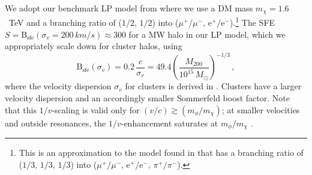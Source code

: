 \documentclass[10pt,aps,pra,reprint,amsmath,amsfonts,amssymb,showpacs,nofootinbib,floatfix]{revtex4-1}
\def\del#1{{}}
\newcommand{\rmn}{\mathrm}
\newcommand{\sfe}{\rmn{sfe}}
\newcommand{\msun}{M_\odot}
\newcommand{\B}{\rmn{B}}
\newcommand{\sigv}{\ensuremath{\sigma_v}}
\newcommand{\mvir}{M_{200}}
\newcommand{\e}{\rmn{e}}
\begin{document}
We adopt our benchmark LP model from \cite{Finkbeiner:2010sm} where we
use a DM mass $m_\chi=1.6$~TeV and a branching ratio of ($1/2,\,1/2$)
into ($\mu^+/\mu^-,\,\e^+/\e^-$).\footnote{This is an approximation to
  the model found in \cite{Finkbeiner:2010sm} that has a branching
  ratio of ($1/3,\,1/3,\,1/3$) into
  ($\mu^+/\mu^-,\,\e^+/\e^-,\,\pi^+/\pi^-$).} The SFE
$S=\B_\sfe(\sigv=200\,km/s)\approx 300$ for a MW halo in our LP model,
which we appropriately scale down for cluster halos, using \del{To
  connect easily to our previous work \cite{2009PhRvL.103r1302P}, we
  choose as our benchmark LP model one with mass $1.6$~TeV and
  Sommerfeld boost $S=\B_\sfe(\sigv=200\,km/s)\approx 300$ for a MW
  halo and scale this appropriately down for cluster halos, using}
\begin{equation}
\B_\sfe(\sigv) = 0.2\, \frac{c}{\sigv} = 
49.4 \left(\frac{\mvir}{10^{15}\,\msun}\right)^{-1/3}\,,
\label{eq:B_sfe}
\end{equation}
where the velocity dispersion $\sigv$ for clusters is derived in
\cite{2005RvMP...77..207V}. Clusters have a larger velocity dispersion
and an accordingly smaller Sommerfeld boost factor. Note that this
$1/v$-scaling is valid only for $(v/c) \gtrsim (m_\phi/m_\chi)$; at
smaller velocities and outside resonances, the $1/v$-enhancement
saturates at $m_\phi/m_\chi$ \cite{2008PhRvL.101z1301K}.
\end{document}
